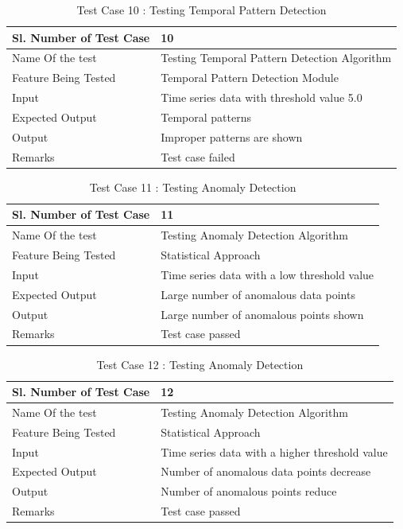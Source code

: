 \documentclass[12pt,a4paper]{report}
\begin{document}
\begin{table}
    \begin{tabular}{|l|l|}
    \hline
    Sl. Number of Test Case & 10                            \\ \hline
    Name Of the test        & Testing Temporal Pattern Detection Algorithm \\ \hline
    Feature Being Tested    & Temporal Pattern Detection Module \\ \hline
    Input                   & Time series data with threshold value 5.0\\ \hline
    Expected Output         & Temporal patterns \\ \hline
    Output                  & Improper patterns are shown \\ \hline
    Remarks                 & Test case failed             \\ \hline
    \end{tabular}
    \caption {Test Case 10 : Testing Temporal Pattern Detection}
\end{table}
\begin{table}
    \begin{tabular}{|l|l|}
    \hline
    Sl. Number of Test Case & 11                            \\ \hline
    Name Of the test        & Testing Anomaly Detection Algorithm\\ \hline
    Feature Being Tested    & Statistical Approach  \\ \hline
    Input                   & Time series data with a low threshold value\\ \hline
    Expected Output         & Large number of anomalous data points \\ \hline
    Output                  & Large number of anomalous points shown \\ \hline
    Remarks                 & Test case passed             \\ \hline
    \end{tabular}
    \caption {Test Case 11 : Testing Anomaly Detection}
\end{table}
\begin{table}
    \begin{tabular}{|l|l|}
    \hline
    Sl. Number of Test Case & 12                            \\ \hline
    Name Of the test        & Testing Anomaly Detection Algorithm\\ \hline
    Feature Being Tested    & Statistical Approach  \\ \hline
    Input                   & Time series data with a higher threshold value\\ \hline
    Expected Output         & Number of anomalous data points decrease \\ \hline
    Output                  & Number of anomalous points reduce \\ \hline
    Remarks                 & Test case passed             \\ \hline
    \end{tabular}
    \caption {Test Case 12 : Testing Anomaly Detection}
\end{table}
\end{document}
